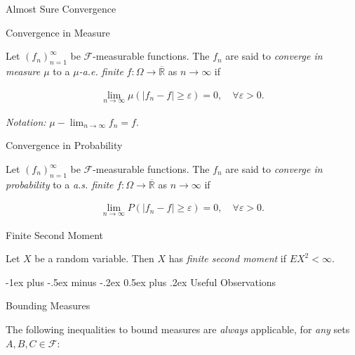 \documentclass[10pt,landscape]{article}
\makeatletter
\renewcommand{\geq}{\geqslant}
\newcommand{\CalF}{\mathcal{F}}
\renewcommand{\section}{\@startsection{section}{1}{0mm}%
                                {-1ex plus -.5ex minus -.2ex}%
                                {0.5ex plus .2ex}%
                                {\normalfont\large\bfseries}}
\makeatother
\begin{document}
\begin{multicols}{3}
\begin{definition}{5.1}{Almost Sure Convergence}
\end{definition}

\begin{definition}{5.2}{Convergence in Measure}

    Let $(f_n)_{n=1}^{\infty}$ be $\CalF$-measurable functions. The $f_n$ are said to \emph{converge in measure $\mu$} to a \emph{$\mu$-a.e. finite} $f: \Omega \to \overline{\mathbb{R}}$ as $n \to \infty$ if

        \begin{align*}
            \lim_{n \to \infty} \mu(|f_n - f| \geq \varepsilon) = 0, \quad \forall \varepsilon > 0.
        \end{align*}

    \emph{Notation:} $\mu-\lim_{n \to \infty} f_n = f$.

\end{definition}

\begin{definition}{5.2}{Convergence in Probability}

    Let $(f_n)_{n=1}^{\infty}$ be $\CalF$-measurable functions. The $f_n$ are said to \emph{converge in probability} to a \emph{a.s. finite} $f: \Omega \to \overline{\mathbb{R}}$ as $n \to \infty$ if

        \begin{align*}
            \lim_{n \to \infty} P(|f_n - f| \geq \varepsilon) = 0, \quad \forall \varepsilon > 0.
        \end{align*}

\end{definition}

\begin{definition}{}{Finite Second Moment}

    Let $X$ be a random variable. Then $X$ has \emph{finite second moment} if $EX^2 < \infty$.

\end{definition}


\section{Useful Observations}

\begin{observation}{}{Bounding Measures}

    The following inequalities to bound measures are \emph{always} applicable, for \emph{any} sets $A, B, C \in \CalF$:


\end{observation}
\end{multicols}
\end{document}
